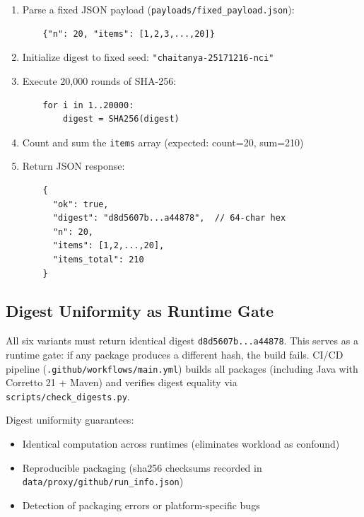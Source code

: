 \begin{enumerate}
    \item Parse a fixed JSON payload (\texttt{payloads/fixed\_payload.json}):
    \begin{verbatim}
    {"n": 20, "items": [1,2,3,...,20]}
    \end{verbatim}
    
    \item Initialize digest to fixed seed: \texttt{"chaitanya-25171216-nci"}
    
    \item Execute 20,000 rounds of SHA-256:
    \begin{verbatim}
    for i in 1..20000:
        digest = SHA256(digest)
    \end{verbatim}
    
    \item Count and sum the \texttt{items} array (expected: count=20, sum=210)
    
    \item Return JSON response:
    \begin{verbatim}
    {
      "ok": true,
      "digest": "d8d5607b...a44878",  // 64-char hex
      "n": 20,
      "items": [1,2,...,20],
      "items_total": 210
    }
    \end{verbatim}
\end{enumerate}

\subsection{Digest Uniformity as Runtime Gate}

All six variants must return identical digest \texttt{d8d5607b...a44878}. This serves as a runtime gate: if any package produces a different hash, the build fails. CI/CD pipeline (\texttt{.github/workflows/main.yml}) builds all packages (including Java with Corretto 21 + Maven) and verifies digest equality via \texttt{scripts/check\_digests.py}.

Digest uniformity guarantees:
\begin{itemize}
    \item Identical computation across runtimes (eliminates workload as confound)
    \item Reproducible packaging (sha256 checksums recorded in \texttt{data/proxy/github/run\_info.json})
    \item Detection of packaging errors or platform-specific bugs
\end{itemize}

